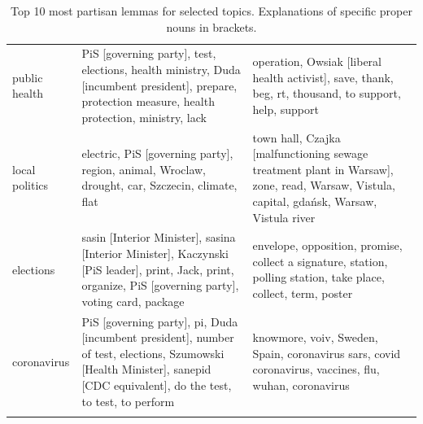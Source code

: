 \documentclass{article}
\begin{document}
\begin{longtable}{p{2cm}p{6cm}p{6cm}}
		public health &                               PiS [governing party], test, elections, health ministry, Duda [incumbent president], prepare, protection measure, health protection, ministry, lack &                                                                                           operation, Owsiak [liberal health activist], save, thank, beg, rt, thousand, to support, help, support \\
		local politics &                                                                                   electric, PiS [governing party], region, animal, Wroclaw, drought, car, Szczecin, climate, flat &                                                         town hall, Czajka [malfunctioning sewage treatment plant in Warsaw], zone, read, Warsaw, Vistula, capital, gdańsk, Warsaw, Vistula river \\
		elections &                          sasin [Interior Minister], sasina [Interior Minister], Kaczynski [PiS leader], print, Jack, print, organize, PiS [governing party], voting card, package &                                                                                  envelope, opposition, promise, collect a signature, station, polling station, take place, collect, term, poster \\
		coronavirus &         PiS [governing party], pi, Duda [incumbent president], number of test, elections, Szumowski [Health Minister], sanepid [CDC equivalent], do the test, to test, to perform &                                                                                            knowmore, voiv, Sweden, Spain, coronavirus sars, covid coronavirus, vaccines, flu, wuhan, coronavirus \\
		\bottomrule
		\caption{Top 10 most partisan lemmas for selected topics. Explanations of specific proper nouns in brackets.}
		\label{tab:phrases}
	\end{longtable}
	
\end{document}
